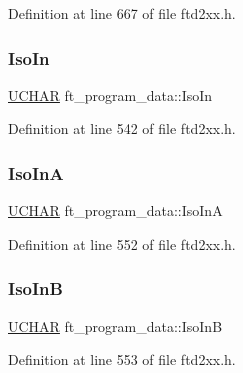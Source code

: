Definition at line 667 of file ftd2xx.\+h.

\mbox{\label{structft__program__data_aa471198716a078ba145f1590388f7ccd}} 
\subsubsection{\texorpdfstring{Iso\+In}{IsoIn}}
{\footnotesize\ttfamily \hyperlink{CatCaloProto40MHz_2inc_2WinTypes_8h_a4f4bb67531a9bf6f0b9c6ad76aeba587}{U\+C\+H\+AR} ft\+\_\+program\+\_\+data\+::\+Iso\+In}



Definition at line 542 of file ftd2xx.\+h.

\mbox{\label{structft__program__data_ab617e7e2235a84c8cf5c62a05f977eeb}} 
\subsubsection{\texorpdfstring{Iso\+InA}{IsoInA}}
{\footnotesize\ttfamily \hyperlink{CatCaloProto40MHz_2inc_2WinTypes_8h_a4f4bb67531a9bf6f0b9c6ad76aeba587}{U\+C\+H\+AR} ft\+\_\+program\+\_\+data\+::\+Iso\+InA}



Definition at line 552 of file ftd2xx.\+h.

\mbox{\label{structft__program__data_acd261bec5257b91b7a3e371da9f25e47}} 
\subsubsection{\texorpdfstring{Iso\+InB}{IsoInB}}
{\footnotesize\ttfamily \hyperlink{CatCaloProto40MHz_2inc_2WinTypes_8h_a4f4bb67531a9bf6f0b9c6ad76aeba587}{U\+C\+H\+AR} ft\+\_\+program\+\_\+data\+::\+Iso\+InB}



Definition at line 553 of file ftd2xx.\+h.

